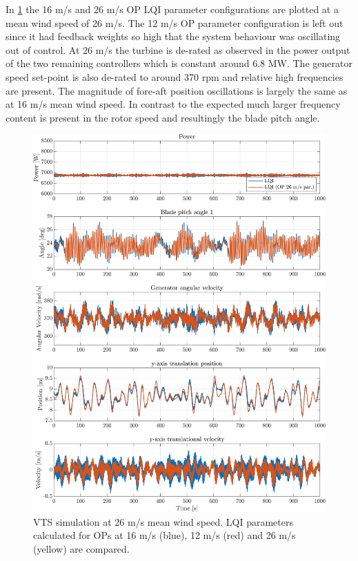 In \cref{fig:vts_30_pow_th_w_py_vy} the 16 m/s and 26 m/s OP LQI parameter configurations are plotted at a mean wind speed of 26 m/s. The 12 m/s OP parameter configuration is left out since it had feedback weights so high that the system behaviour was oscillating out of control. At 26 m/s the turbine is de-rated as observed in the power output of the two remaining controllers which is constant around 6.8 MW. The generator speed set-point is also de-rated to around 370 rpm and relative high frequencies are present. The magnitude of fore-aft position oscillations is largely the same as at 16 m/s mean wind speed. In contrast to the expected much larger frequency content is present in the rotor speed and resultingly the blade pitch angle.
\begin{figure}[h]
	\centering
	\includegraphics[width=0.7\linewidth]{Graphics/TestResults/VTSplotting/30_pow_th_w_py_vy.png}
	\caption{VTS simulation at 26 m/s mean wind speed. LQI parameters calculated for OPs at 16 m/s (blue), 12 m/s (red) and 26 m/s (yellow) are compared.}
	\label{fig:vts_30_pow_th_w_py_vy}
\end{figure}
